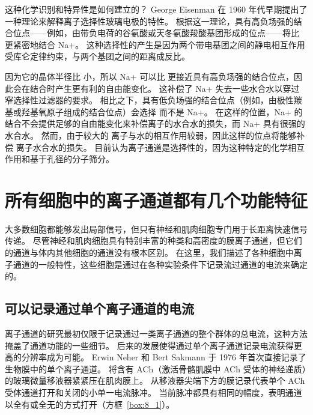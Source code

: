 这种化学识别和特异性是如何建立的？
George Eisenman 在 1960 年代早期提出了一种理论来解释离子选择性玻璃电极的特性。
根据这一理论，具有高负场强的结合位点——例如，由带负电荷的谷氨酸或天冬氨酸羧酸基团形成的位点——将比  更紧密地结合 Na+。
这种选择性的产生是因为两个带电基团之间的静电相互作用受库仑定律约束，与两个基团之间的距离成反比。


因为它的晶体半径比  小，所以 Na+ 可以比  更接近具有高负场强的结合位点，因此会在结合时产生更有利的自由能变化。
这补偿了 Na+ 失去一些水合水以穿过窄选择性过滤器的要求。
相比之下，具有低负场强的结合位点（例如，由极性羰基或羟基氧原子组成的结合位点）会选择  而不是 Na+。
在这样的位置，Na+ 的结合不会提供足够的自由能变化来补偿离子的水合水的损失，而 Na+ 具有很强的水合水。
然而，由于较大的  离子与水的相互作用较弱，因此这样的位点将能够补偿  离子水合水的损失。
目前认为离子通道是选择性的，因为这种特定的化学相互作用和基于孔径的分子筛分。



\section{所有细胞中的离子通道都有几个功能特征}

大多数细胞都能够发出局部信号，但只有神经和肌肉细胞专门用于长距离快速信号传递。
尽管神经和肌肉细胞具有特别丰富的种类和高密度的膜离子通道，但它们的通道与体内其他细胞的通道没有根本区别。
在这里，我们描述了各种细胞中离子通道的一般特性，这些细胞是通过在各种实验条件下记录流过通道的电流来确定的。



\subsection{可以记录通过单个离子通道的电流}

离子通道的研究最初仅限于记录通过一类离子通道的整个群体的总电流，这种方法掩盖了通道功能的一些细节。
后来的发展使得通过单个离子通道记录电流获得更高的分辨率成为可能。
Erwin Neher 和 Bert Sakmann 于 1976 年首次直接记录了生物膜中的单个离子通道。
将含有 ACh（激活骨骼肌膜中 ACh 受体的神经递质）的玻璃微量移液器紧紧压在肌肉膜上。
从移液器尖端下方的膜记录代表单个 ACh 受体通道打开和关闭的小单一电流脉冲。
当前脉冲都具有相同的幅度，表明通道以全有或全无的方式打开（方框~\ref{box:8_1}）。


